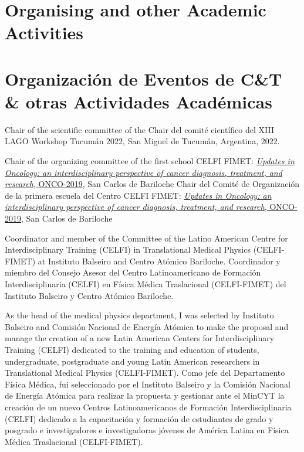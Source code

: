 \ifeng
\section*{Organising and other Academic Activities}
\else
\section*{Organización de Eventos de C\&T \& otras Actividades Académicas}
\fi

\ifeng
Chair of the scientific committee of the
\else
Chair del comité científico del
\fi
XIII LAGO Workshop Tucumán 2022, San Miguel de Tucumán, Argentina, 2022.

\ifeng
Chair of the organizing committee of the first school CELFI FIMET: \href{https://fisica.cab.cnea.gov.ar/fisicamedica/celfi-oncology/}{{\emph{Updates in Oncology: an interdisciplinary perspective of cancer diagnosis, treatment, and research}}, ONCO-2019}, San Carlos de Bariloche
\else
Chair del Comité de Organización de la primera escuela del Centro CELFI FIMET: \href{https://fisica.cab.cnea.gov.ar/fisicamedica/celfi-oncology/}{{\emph{Updates in Oncology: an interdisciplinary perspective of cancer diagnosis, treatment, and research}}, ONCO-2019}, San Carlos de Bariloche
\fi

\ifeng
Coordinator and member of the Committee of the Latino American Centre for Interdisciplinary Training (CELFI) in Translational Medical Physics (CELFI-FIMET) at Instituto Balseiro and Centro Atómico Bariloche.
\else
Coordinador y miembro del Consejo Asesor del Centro Latinoamericano de Formación Interdisciplinaria (CELFI) en Física Médica Traslacional (CELFI-FIMET) del Instituto Balseiro y Centro Atómico Bariloche.
\fi

\ifeng
As the head of the medical physics department, I was selected by Instituto Balseiro and Comisión Nacional de Energía Atómica to make the proposal and manage the creation of a new Latin American Centers for Interdisciplinary Training (CELFI) dedicated to the training and education of students, undergraduate, postgraduate and young Latin American researchers in Translational Medical Physics (CELFI-FIMET).
\else
Como jefe del Departamento Física Médica, fui seleccionado por el Instituto Balseiro y la Comisión Nacional de Energía Atómica para realizar la propuesta y gestionar ante el MinCYT la creación de un nuevo Centros Latinoamericanos de Formación Interdisciplinaria (CELFI) dedicado a la capacitación y formación de estudiantes de grado y posgrado e investigadores e investigadoras jóvenes de América Latina en Física Médica Traslacional (CELFI-FIMET).
\fi

